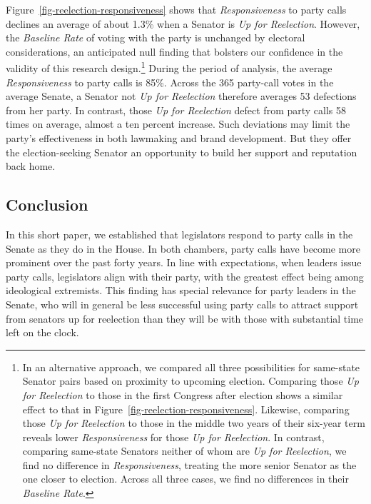 \documentclass[12pt]{article}
\begin{document}
Figure~\ref{fig-reelection-responsiveness} shows that \textit{Responsiveness} to party calls declines an average of about 1.3\% when a Senator is \textit{Up for Reelection}.  However, the \textit{Baseline Rate} of voting with the party is unchanged by electoral considerations,
an anticipated null finding that bolsters our confidence in the validity of this research design.\footnote{\doublespacing\normalsize  In an alternative approach, we compared all three possibilities for same-state Senator pairs based on proximity to upcoming election.  Comparing those \textit{Up for Reelection} to those in the first Congress after election shows a similar effect to that in Figure~\ref{fig-reelection-responsiveness}.  Likewise, comparing those \textit{Up for Reelection} to those in the middle two years of their six-year term reveals lower \textit{Responsiveness} for those \textit{Up for Reelection}.  In contrast, comparing same-state Senators neither of whom are \textit{Up for Reelection}, we find no difference in \textit{Responsiveness}, treating the more senior Senator as the one closer to election.  Across all three cases, we find no differences in their \textit{Baseline Rate}.}
During the period of analysis, the average \textit{Responsiveness} to party calls is 85\%. Across the 365 party-call votes in the average Senate, a Senator not \textit{Up for Reelection} therefore averages 53 defections from her party.  In contrast, those \textit{Up for Reelection} defect from party calls 58 times on average, almost a ten percent increase.  Such deviations may limit the party's effectiveness in both lawmaking and brand development.  But they offer the election-seeking Senator an opportunity to build her support and reputation back home.

\subsection*{Conclusion}

In this short paper, we established that legislators respond to party calls in the Senate as they do in the House. In both chambers, party calls have become more prominent over the past forty years. In line with expectations, when leaders issue party calls, legislators align with their party, with the greatest effect being among ideological extremists. This finding has special relevance for party leaders in the Senate, who will in general be less successful using party calls to attract support from senators up for reelection than they will be with those with substantial time left on the clock.
\end{document}
